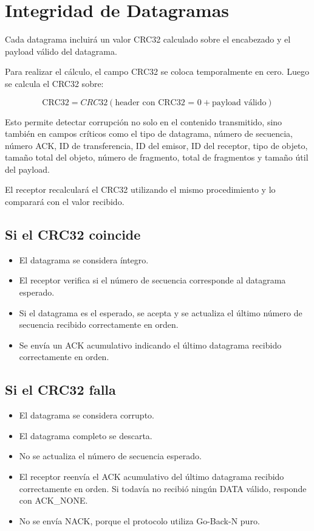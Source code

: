 \documentclass[12pt]{article}
\begin{document}
\section{Integridad de Datagramas}

Cada datagrama incluirá un valor CRC32 calculado sobre el encabezado y el payload válido del datagrama.

Para realizar el cálculo, el campo CRC32 se coloca temporalmente en cero. Luego se calcula el CRC32 sobre:

\[
\text{CRC32} = CRC32(\text{header con CRC32 = 0} + \text{payload válido})
\]

Esto permite detectar corrupción no solo en el contenido transmitido, sino también en campos críticos como el tipo de datagrama, número de secuencia, número ACK, ID de transferencia, ID del emisor, ID del receptor, tipo de objeto, tamaño total del objeto, número de fragmento, total de fragmentos y tamaño útil del payload.

El receptor recalculará el CRC32 utilizando el mismo procedimiento y lo comparará con el valor recibido.

\subsection{Si el CRC32 coincide}

\begin{itemize}
\item El datagrama se considera íntegro.
\item El receptor verifica si el número de secuencia corresponde al datagrama esperado.
\item Si el datagrama es el esperado, se acepta y se actualiza el último número de secuencia recibido correctamente en orden.
\item Se envía un ACK acumulativo indicando el último datagrama recibido correctamente en orden.
\end{itemize}

\subsection{Si el CRC32 falla}

\begin{itemize}
\item El datagrama se considera corrupto.
\item El datagrama completo se descarta.
\item No se actualiza el número de secuencia esperado.
\item El receptor reenvía el ACK acumulativo del último datagrama recibido correctamente en orden. Si todavía no recibió ningún DATA válido, responde con ACK\_NONE.
\item No se envía NACK, porque el protocolo utiliza Go-Back-N puro.
\end{itemize}
\end{document}

